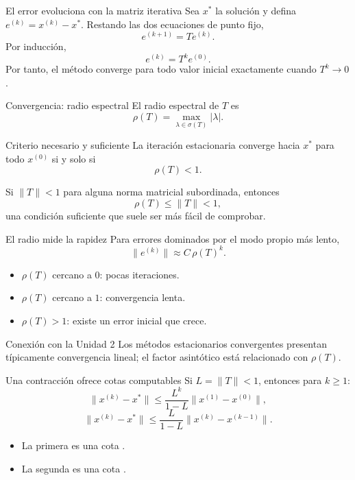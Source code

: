 \documentclass[aspectratio=169,12pt]{beamer}
\begin{document}
\begin{frame}{El error evoluciona con la matriz iterativa}
Sea $x^*$ la solución y defina $e^{(k)}=x^{(k)}-x^*$. Restando las dos
ecuaciones de punto fijo,
\[
e^{(k+1)}=Te^{(k)}.
\]
Por inducción,
\[
\boxed{e^{(k)}=T^ke^{(0)}}.
\]
Por tanto, el método converge para todo valor inicial exactamente cuando
$T^k\to0$.
\end{frame}

\begin{frame}{Convergencia: radio espectral}
El radio espectral de $T$ es
\[
\rho(T)=\max_{\lambda\in\sigma(T)}|\lambda|.
\]
\begin{block}{Criterio necesario y suficiente}
La iteración estacionaria converge hacia $x^*$ para todo $x^{(0)}$ si y solo si
\[
\boxed{\rho(T)<1}.
\]
\end{block}
Si $\|T\|<1$ para alguna norma matricial subordinada, entonces
\[
\rho(T)\leq\|T\|<1,
\]
una condición suficiente que suele ser más fácil de comprobar.
\end{frame}

\begin{frame}{El radio mide la rapidez}
Para errores dominados por el modo propio más lento,
\[
\|e^{(k)}\|\approx C\,\rho(T)^k.
\]
\begin{itemize}
  \item $\rho(T)$ cercano a $0$: pocas iteraciones.
  \item $\rho(T)$ cercano a $1$: convergencia lenta.
  \item $\rho(T)>1$: existe un error inicial que crece.
\end{itemize}
\begin{block}{Conexión con la Unidad 2}
Los métodos estacionarios convergentes presentan típicamente convergencia
lineal; el factor asintótico está relacionado con $\rho(T)$.
\end{block}
\end{frame}

\begin{frame}{Una contracción ofrece cotas computables}
Si $L=\|T\|<1$, entonces para $k\geq1$:
\[
\|x^{(k)}-x^*\|
\leq \frac{L^k}{1-L}\|x^{(1)}-x^{(0)}\|,
\]
\[
\|x^{(k)}-x^*\|
\leq \frac{L}{1-L}\|x^{(k)}-x^{(k-1)}\|.
\]
\begin{itemize}
  \item La primera es una cota .
  \item La segunda es una cota .
\end{itemize}
\end{frame}
\end{document}
